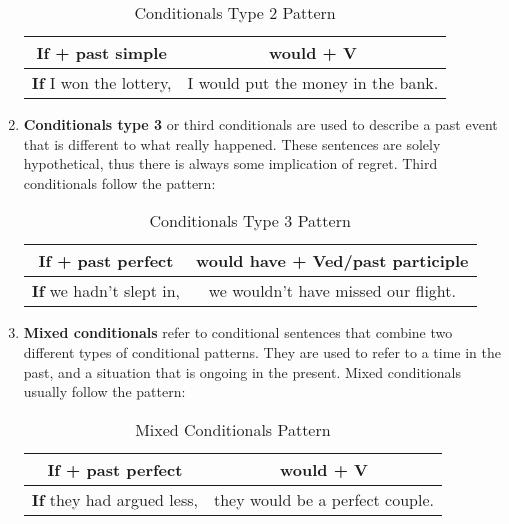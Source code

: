 \documentclass[hidelinks,10pt,a4paper]{article}
\begin{document}
\begin{enumerate}[label=(\alph*)]
		\begin{table}[h]
		\begin{center}
		\begin{tabular}{|c|c|}
			\hline
			\textbf{If + past simple} & \textbf{would + V} \\ \hline
			\textbf{If} I won the lottery, & I would put the money in the bank. \\ \hline
		\end{tabular}
		\end{center}
		\caption{Conditionals Type 2 Pattern} \label{tab:ct2}
		\end{table}

	\item \textbf{Conditionals type 3} or third conditionals are used to describe a past event that is different to what really happened. These sentences are solely hypothetical, thus there is always some implication of regret. Third conditionals follow the pattern:
		\begin{table}[h!]
		\begin{center}
		\begin{tabular}{|c|c|}
			\hline
			\textbf{If + past perfect} & \textbf{would have + Ved/past participle} \\ \hline
			\textbf{If} we hadn't slept in, & we wouldn't have missed our flight. \\ \hline
		\end{tabular}
		\end{center}
		\caption{Conditionals Type 3 Pattern} \label{tab:ct3}
		\end{table}
	\item \textbf{Mixed conditionals} refer to conditional sentences that combine two different types of conditional patterns. They are used to refer to a time in the past, and a situation that is ongoing in the present. Mixed conditionals usually follow the pattern:
		\begin{table}[h!]
		\begin{center}
		\begin{tabular}{|c|c|}
			\hline
			\textbf{If + past perfect} & \textbf{would + V} \\ \hline
			\textbf{If} they had argued less, & they would be a perfect couple. \\ \hline
		\end{tabular}
		\end{center}
		\caption{Mixed Conditionals Pattern} \label{tab:mi}
		\end{table}

\end{enumerate}
\end{document}

